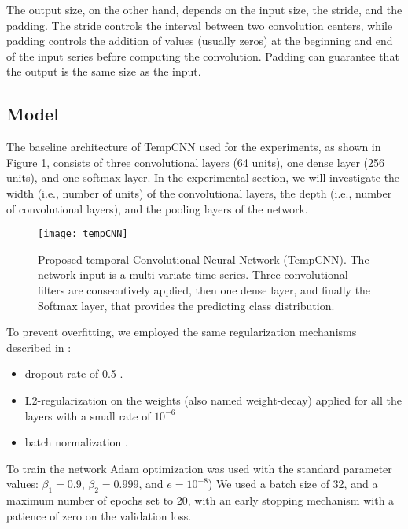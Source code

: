 The output size, on the other hand, depends on the input size, the stride, and the padding.
The stride controls the interval between two convolution centers, while padding controls the addition of values (usually zeros) at the beginning and end of the input series before computing the convolution. 
Padding can guarantee that the output is the same size as the input.


\subsection{Model}

The baseline architecture of TempCNN used for the experiments, as shown in Figure \ref{fig:temCNNArchitecture}, consists of three convolutional layers (64 units), one dense layer (256 units), and one softmax layer.
In the experimental section, we will investigate the width (i.e., number of units) of the convolutional layers, the depth (i.e., number of convolutional layers), and the pooling layers of the network.

\begin{figure}[H]
  \centering
  \texttt{[image: tempCNN]}
  \caption{Proposed temporal Convolutional Neural Network (TempCNN). The network input is a
  multi-variate time series. Three convolutional filters are consecutively applied, then one dense layer,
  and finally the Softmax layer, that provides the predicting class distribution.    \cite{tempCNN}}
  \label{fig:temCNNArchitecture}
\end{figure}


To prevent overfitting, we employed the same regularization mechanisms described in \cite{tempCNN}:

\begin{itemize}
  \item dropout rate of 0.5 \cite{JMLR:v15:srivastava14a}. 
  \item L2-regularization on the weights (also named weight-decay) applied for all the layers with a small rate of $10^{-6}$ 
  \item batch normalization \cite{DBLP:journals/corr/IoffeS15}.
\end{itemize}

To train the network Adam optimization was used with the standard parameter values: $\beta_1 = 0.9$, $\beta_2 = 0.999$, and $e = 10^{-8}$) \cite{kingma2014adam} 
We used a batch size of 32, and a maximum number of epochs set to 20, with an early stopping mechanism with a patience of zero on the validation loss. 


